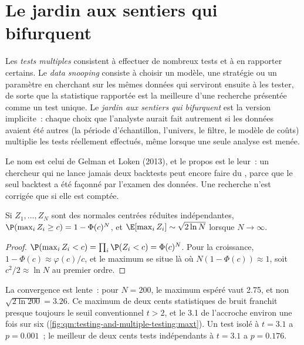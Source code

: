 \section{Le jardin aux sentiers qui bifurquent}

\begin{definition}\label{def:qm:testing-and-multiple-testing:snooping}
Les \emph{tests multiples} consistent à effectuer de nombreux tests et à en rapporter certains. Le \emph{data
snooping} consiste à choisir un modèle, une stratégie ou un paramètre en cherchant sur les mêmes données qui serviront ensuite à
les tester, de sorte que la statistique rapportée est la meilleure d'une recherche présentée comme un test unique. Le \emph{jardin aux sentiers qui
bifurquent} est la version implicite~: chaque choix que l'analyste aurait fait autrement si les données
avaient été autres (la période d'échantillon, l'univers, le filtre, le modèle de coûts) multiplie les tests réellement effectués, même lorsque
une seule analyse est menée.
\end{definition}

Le nom est celui de Gelman et Loken (2013), et le propos est le leur~: un chercheur qui ne lance jamais deux backtests peut encore faire du ,
parce que le seul backtest a été façonné par l'examen des données. Une recherche n'est corrigée que si elle est comptée.

\begin{proposition}\label{prop:qm:testing-and-multiple-testing:max}
Si $Z_1, \dots, Z_N$ sont des normales centrées réduites indépendantes, $\P(\max_i Z_i \ge c) = 1 - \Phi(c)^N$, et $\E[\max_i Z_i] \sim
\sqrt{2\ln N}$ lorsque $N \to \infty$.
\end{proposition}

\begin{proof}
$\P(\max_i Z_i < c) = \prod_i\P(Z_i < c) = \Phi(c)^N$. Pour la croissance, $1 - \Phi(c) \approx \varphi(c)/c$, et le maximum se situe là où
$N(1 - \Phi(c)) \approx 1$, soit $c^2/2 \approx \ln N$ au premier ordre.
\end{proof}

La convergence est lente~: pour $N = 200$, le maximum espéré vaut 2.75, et non $\sqrt{2\ln200} = 3.26$. Ce maximum de deux cents
statistiques de bruit franchit presque toujours le seuil conventionnel $t > 2$, et le 3.1 de l'accroche environ une fois sur six
(\cref{fig:qm:testing-and-multiple-testing:maxt}). Un test isolé à $t = 3.1$ a $p = 0.001$~; le meilleur de deux cents tests indépendants à $t = 3.1$
a $p = 0.176$.

